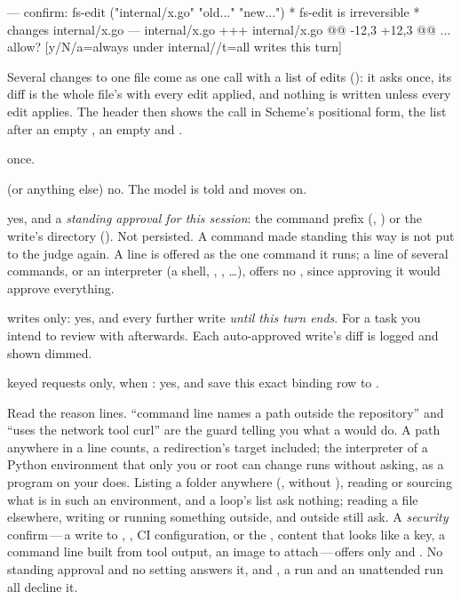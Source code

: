 \begin{txt}
--- confirm: fs-edit ("internal/x.go" "old..." "new...")
  * fs-edit is irreversible
  * changes internal/x.go
  --- internal/x.go
  +++ internal/x.go
  @@ -12,3 +12,3 @@
  ...
allow? [y/N/a=always under internal//t=all writes this turn]
\end{txt}

Several changes to one file come as one  call with a list of
edits (): it asks once, its diff is the whole file's with every edit
applied, and nothing is written unless every edit applies. The header then
shows the call in Scheme's positional form, the list after an empty
, an empty  and .

\begin{description}[leftmargin=2.2em]
\item[\code{y}] once.
\item[\code{N}] (or anything else) no. The model is told
   and moves on.
\item[\code{a}] yes, and a \emph{standing approval for this session}: the
  command prefix (, ) or the write's directory
  (). Not persisted. A command made standing this
  way is not put to the judge again. A  line is offered as
  the one command it runs; a line of several commands, or an interpreter
  (a shell, , , \ldots), offers no
  , since approving it would approve everything.
\item[\code{t}] writes only: yes, and every further write \emph{until this
  turn ends}. For a task you intend to review with 
  afterwards. Each auto-approved write's diff is logged and shown dimmed.
\item[\code{b}] keyed requests only, when : yes, and save this exact binding row to .
\end{description}

Read the reason lines. ``command line names a path outside the repository''
and ``uses the network tool curl'' are the guard telling you what a
 would do. A path anywhere in a  line counts, a
redirection's target included; the interpreter of a Python environment that
only you or root can change runs without asking, as a program on your
 does. Listing a folder anywhere (,  without
), reading or sourcing what is in such an environment, and a
 loop's list ask nothing; reading a file elsewhere, writing or
running something outside, and  outside still ask. A \emph{security} confirm\,---\,a write to ,
, CI configuration,  or the ,
content that looks like a key, a command line built from tool output, an
image to attach\,---\,offers only  and . No standing
approval and no \code{[approval]} setting answers it, and ,
a  run and an unattended run all decline it.

